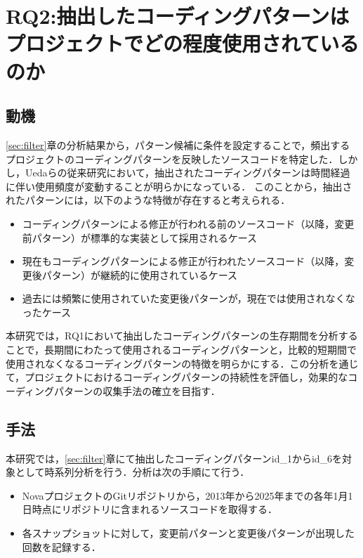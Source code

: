 \documentclass[11pt]{jreport}
\newcommand{\RQtwo}{抽出したコーディングパターンはプロジェクトでどの程度使用されているのか}
\begin{document}
\chapter{RQ2:\RQtwo}\label{sec:time}
\section{動機}
\ref{sec:filter}章の分析結果から，パターン候補に条件を設定することで，頻出するプロジェクトのコーディングパターンを反映したソースコードを特定した．しかし，Uedaらの従来研究\cite{devreplay}において，抽出されたコーディングパターンは時間経過に伴い使用頻度が変動することが明らかになっている．
このことから，抽出されたパターンには，以下のような特徴が存在すると考えられる．
\begin{itemize}
    \item コーディングパターンによる修正が行われる前のソースコード（以降，変更前パターン）が標準的な実装として採用されるケース
    \item 現在もコーディングパターンによる修正が行われたソースコード（以降，変更後パターン）が継続的に使用されているケース
    \item 過去には頻繁に使用されていた変更後パターンが，現在では使用されなくなったケース
\end{itemize}
本研究では，RQ1において抽出したコーディングパターンの生存期間を分析することで，長期間にわたって使用されるコーディングパターンと，比較的短期間で使用されなくなるコーディングパターンの特徴を明らかにする．この分析を通じて，プロジェクトにおけるコーディングパターンの持続性を評価し，効果的なコーディングパターンの収集手法の確立を目指す．

\section{手法}
本研究では，\ref{sec:filter}章にて抽出したコーディングパターンid\_1からid\_6を対象として時系列分析を行う．分析は次の手順にて行う．
\begin{itemize}
    \item NovaプロジェクトのGitリポジトリから，2013年から2025年までの各年1月1日時点にリポジトリに含まれるソースコードを取得する．
    \item 各スナップショットに対して，変更前パターンと変更後パターンが出現した回数を記録する．
\end{itemize}
\end{document}
